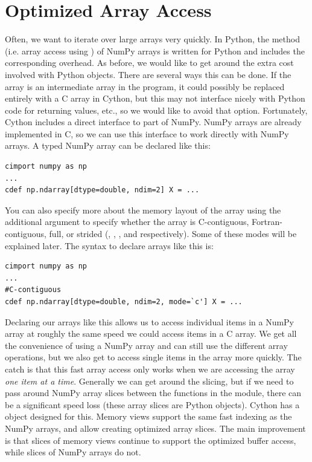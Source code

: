 \section*{Optimized Array Access}
Often, we want to iterate over large arrays very quickly.
In Python, the  method (i.e. array access using \li{[ ]}) of NumPy arrays is written for Python and includes the corresponding overhead.
As before, we would like to get around the extra cost involved with Python objects.
There are several ways this can be done.
If the array is an intermediate array in the program, it could possibly be replaced entirely with a C array in Cython, but this may not interface nicely with Python code for returning values, etc., so we would like to avoid that option.
Fortunately, Cython includes a direct interface to part of NumPy.
NumPy arrays are already implemented in C, so we can use this interface to work directly with NumPy arrays.
A typed NumPy array can be declared like this:
\begin{lstlisting}
cimport numpy as np
...
cdef np.ndarray[dtype=double, ndim=2] X = ...
\end{lstlisting}
You can also specify more about the memory layout of the array using the additional argument  to specify whether the array is C-contiguous, Fortran-contiguous, full, or strided (, , , and  respectively).
Some of these modes will be explained later.
The syntax to declare arrays like this is:
\begin{lstlisting}
cimport numpy as np
...
#C-contiguous
cdef np.ndarray[dtype=double, ndim=2, mode=`c'] X = ...
\end{lstlisting}
Declaring our arrays like this allows us to access individual items in a NumPy array at roughly the same speed we could access items in a C array.
We get all the convenience of using a NumPy array and can still use the different array operations, but we also get to access single items in the array more quickly.
The catch is that this fast array access only works when we are accessing the array \textit{one item at a time}.
Generally we can get around the slicing, but if we need to pass around NumPy array slices between the functions in the module, there can be a significant speed loss (these array slices are Python objects).
Cython has a  object designed for this.
Memory views support the same fast indexing as the NumPy arrays, and allow creating optimized array slices.
The main improvement is that slices of memory views continue to support the optimized buffer access, while slices of NumPy arrays do not.

